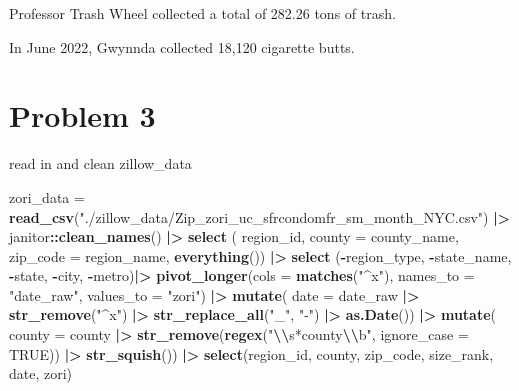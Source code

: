 \documentclass[
]{article}
\newenvironment{Shaded}{\begin{snugshade}}{\end{snugshade}}
\newcommand{\AttributeTok}[1]{\textcolor[rgb]{0.13,0.29,0.53}{#1}}
\newcommand{\ConstantTok}[1]{\textcolor[rgb]{0.56,0.35,0.01}{#1}}
\newcommand{\FunctionTok}[1]{\textcolor[rgb]{0.13,0.29,0.53}{\textbf{#1}}}
\newcommand{\NormalTok}[1]{#1}
\newcommand{\OtherTok}[1]{\textcolor[rgb]{0.56,0.35,0.01}{#1}}
\newcommand{\SpecialCharTok}[1]{\textcolor[rgb]{0.81,0.36,0.00}{\textbf{#1}}}
\newcommand{\StringTok}[1]{\textcolor[rgb]{0.31,0.60,0.02}{#1}}
\begin{document}
Professor Trash Wheel collected a total of 282.26 tons of trash.

In June 2022, Gwynnda collected 18,120 cigarette butts.

\section{Problem 3}\label{problem-3}

read in and clean zillow\_data

\begin{Shaded}
\begin{Highlighting}[]
\NormalTok{zori\_data }\OtherTok{=} 
  \FunctionTok{read\_csv}\NormalTok{(}\StringTok{"./zillow\_data/Zip\_zori\_uc\_sfrcondomfr\_sm\_month\_NYC.csv"}\NormalTok{) }\SpecialCharTok{|\textgreater{}}
\NormalTok{  janitor}\SpecialCharTok{::}\FunctionTok{clean\_names}\NormalTok{() }\SpecialCharTok{|\textgreater{}}
  \FunctionTok{select}\NormalTok{ (}
\NormalTok{    region\_id,}
    \AttributeTok{county =}\NormalTok{ county\_name,}
    \AttributeTok{zip\_code =}\NormalTok{ region\_name,}
    \FunctionTok{everything}\NormalTok{()) }\SpecialCharTok{|\textgreater{}}
  \FunctionTok{select}\NormalTok{ (}\SpecialCharTok{{-}}\NormalTok{region\_type, }\SpecialCharTok{{-}}\NormalTok{state\_name, }\SpecialCharTok{{-}}\NormalTok{state, }\SpecialCharTok{{-}}\NormalTok{city, }\SpecialCharTok{{-}}\NormalTok{metro)}\SpecialCharTok{|\textgreater{}}
  \FunctionTok{pivot\_longer}\NormalTok{(}\AttributeTok{cols =} \FunctionTok{matches}\NormalTok{(}\StringTok{"\^{}x"}\NormalTok{),}
               \AttributeTok{names\_to =} \StringTok{"date\_raw"}\NormalTok{,}
               \AttributeTok{values\_to =} \StringTok{"zori"}\NormalTok{) }\SpecialCharTok{|\textgreater{}}
  \FunctionTok{mutate}\NormalTok{(}
    \AttributeTok{date =}\NormalTok{ date\_raw }\SpecialCharTok{|\textgreater{}}
      \FunctionTok{str\_remove}\NormalTok{(}\StringTok{"\^{}x"}\NormalTok{) }\SpecialCharTok{|\textgreater{}}
      \FunctionTok{str\_replace\_all}\NormalTok{(}\StringTok{"\_"}\NormalTok{, }\StringTok{"{-}"}\NormalTok{) }\SpecialCharTok{|\textgreater{}}
      \FunctionTok{as.Date}\NormalTok{()) }\SpecialCharTok{|\textgreater{}}
  \FunctionTok{mutate}\NormalTok{(}
    \AttributeTok{county =}\NormalTok{ county }\SpecialCharTok{|\textgreater{}}
      \FunctionTok{str\_remove}\NormalTok{(}\FunctionTok{regex}\NormalTok{(}\StringTok{"}\SpecialCharTok{\textbackslash{}\textbackslash{}}\StringTok{s*county}\SpecialCharTok{\textbackslash{}\textbackslash{}}\StringTok{b"}\NormalTok{, }\AttributeTok{ignore\_case =} \ConstantTok{TRUE}\NormalTok{)) }\SpecialCharTok{|\textgreater{}}
      \FunctionTok{str\_squish}\NormalTok{()) }\SpecialCharTok{|\textgreater{}}
  \FunctionTok{select}\NormalTok{(region\_id, county, zip\_code, size\_rank, date, zori)}
\end{Highlighting}
\end{Shaded}
\end{document}
